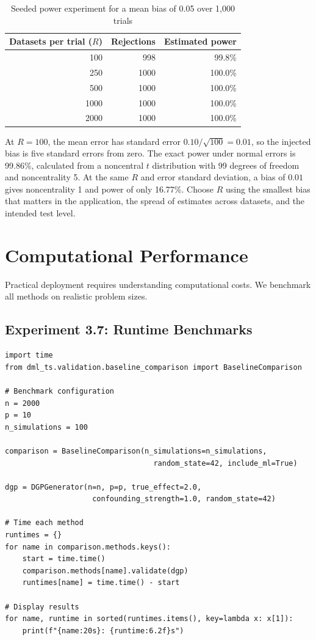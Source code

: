 \begin{table}[htbp]
\centering
\caption{Seeded power experiment for a mean bias of 0.05 over 1,000 trials}
\label{tab:exp36_power}
\begin{tabular}{rrr}
\hline
\textbf{Datasets per trial ($R$)} & \textbf{Rejections} & \textbf{Estimated power} \\
\hline
100 & 998 & 99.8\% \\
250 & 1000 & 100.0\% \\
500 & 1000 & 100.0\% \\
1000 & 1000 & 100.0\% \\
2000 & 1000 & 100.0\% \\
\hline
\end{tabular}
\end{table}

At $R=100$, the mean error has standard error $0.10/\sqrt{100}=0.01$, so the
injected bias is five standard errors from zero. The exact power under normal
errors is 99.86\%, calculated from a noncentral $t$ distribution with 99 degrees
of freedom and noncentrality 5. At the same $R$ and error standard deviation,
a bias of $0.01$ gives noncentrality 1 and power of only 16.77\%.
Choose $R$ using the smallest bias that matters in the application, the spread
of estimates across datasets, and the intended test level.


\section{Computational Performance}

Practical deployment requires understanding computational costs. We benchmark all methods on realistic problem sizes.

\subsection{Experiment 3.7: Runtime Benchmarks}

\begin{verbatim}
import time
from dml_ts.validation.baseline_comparison import BaselineComparison

# Benchmark configuration
n = 2000
p = 10
n_simulations = 100

comparison = BaselineComparison(n_simulations=n_simulations,
                                  random_state=42, include_ml=True)

dgp = DGPGenerator(n=n, p=p, true_effect=2.0,
                    confounding_strength=1.0, random_state=42)

# Time each method
runtimes = {}
for name in comparison.methods.keys():
    start = time.time()
    comparison.methods[name].validate(dgp)
    runtimes[name] = time.time() - start

# Display results
for name, runtime in sorted(runtimes.items(), key=lambda x: x[1]):
    print(f"{name:20s}: {runtime:6.2f}s")
\end{verbatim}

